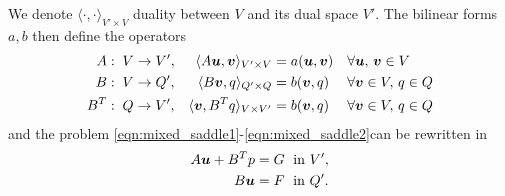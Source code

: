 %
We denote $\langle \cdot, \cdot \rangle_{V'\times V}$ duality between $V$ and its dual space $V'$.
The bilinear forms $a,b$ then define the operators
\begin{align*}
A:\;\;&   V \rightarrow V', & \langle A\mathbf{\boldsymbol{u}},\mathbf{\boldsymbol{v}} \rangle_{V'\times V} =&\; a(\mathbf{\boldsymbol{u}},\mathbf{\boldsymbol{v}}) && \forall \mathbf{\boldsymbol{u}},\, \mathbf{\boldsymbol{v}} \in V\\ 
B:\;\;&   V \rightarrow Q', & \langle B \mathbf{\boldsymbol{v}},q    \rangle_{Q'\times Q} =&\; b(\mathbf{\boldsymbol{v}},q)     && \forall \mathbf{\boldsymbol{v}}\in V,\,q \in Q\\
B^T:\;\;& Q \rightarrow V', & \langle \mathbf{\boldsymbol{v}}, B^T q \rangle_{V\times V'} =&\; b(\mathbf{\boldsymbol{v}},q)     && \forall \mathbf{\boldsymbol{v}}\in V,\,q \in Q
\end{align*}
and the problem \eqref{eqn:mixed_saddle1}-\eqref{eqn:mixed_saddle2}can be rewritten in
\begin{align}
 A\mathbf{\boldsymbol{u}} + B^Tp &= G \;\textrm{  in } V', \label{eqn:saddle3} \\
 B\mathbf{\boldsymbol{u}} &= F  \;\textrm{  in } Q'. \label{eqn:saddle4}
\end{align}


